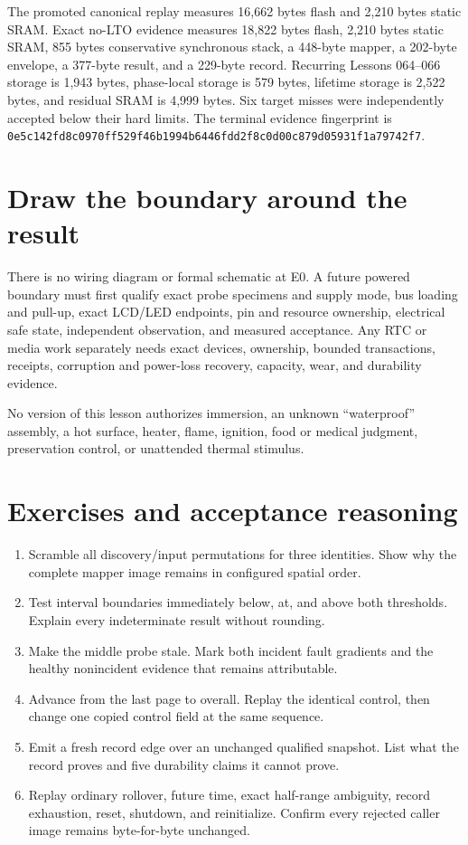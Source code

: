 \documentclass[10pt]{article}
\begin{document}
The promoted canonical replay measures 16,662 bytes flash and 2,210 bytes
static SRAM. Exact no-LTO evidence measures 18,822 bytes flash, 2,210 bytes
static SRAM, 855 bytes conservative synchronous stack, a 448-byte mapper, a
202-byte envelope, a 377-byte result, and a 229-byte record. Recurring
Lessons 064--066 storage is 1,943 bytes, phase-local storage is 579 bytes,
lifetime storage is 2,522 bytes, and residual SRAM is 4,999 bytes. Six target
misses were independently accepted below their hard limits. The terminal
evidence fingerprint is
\texttt{0e5c142fd8c0970ff529f46b1994b6446fdd2f8c0d00c879d05931f1a79742f7}.

\newpage
\section{Draw the boundary around the result}
There is no wiring diagram or formal schematic at E0. A future powered
boundary must first qualify exact probe specimens and supply mode, bus loading
and pull-up, exact LCD/LED endpoints, pin and resource ownership, electrical
safe state, independent observation, and measured acceptance. Any RTC or
media work separately needs exact devices, ownership, bounded transactions,
receipts, corruption and power-loss recovery, capacity, wear, and durability
evidence.

No version of this lesson authorizes immersion, an unknown ``waterproof''
assembly, a hot surface, heater, flame, ignition, food or medical judgment,
preservation control, or unattended thermal stimulus.

\section{Exercises and acceptance reasoning}
\begin{enumerate}
 \item Scramble all discovery/input permutations for three identities. Show
       why the complete mapper image remains in configured spatial order.
 \item Test interval boundaries immediately below, at, and above both
       thresholds. Explain every indeterminate result without rounding.
 \item Make the middle probe stale. Mark both incident fault gradients and
       the healthy nonincident evidence that remains attributable.
 \item Advance from the last page to overall. Replay the identical control,
       then change one copied control field at the same sequence.
 \item Emit a fresh record edge over an unchanged qualified snapshot. List
       what the record proves and five durability claims it cannot prove.
 \item Replay ordinary rollover, future time, exact half-range ambiguity,
       record exhaustion, reset, shutdown, and reinitialize. Confirm every
       rejected caller image remains byte-for-byte unchanged.
\end{enumerate}
\end{document}
